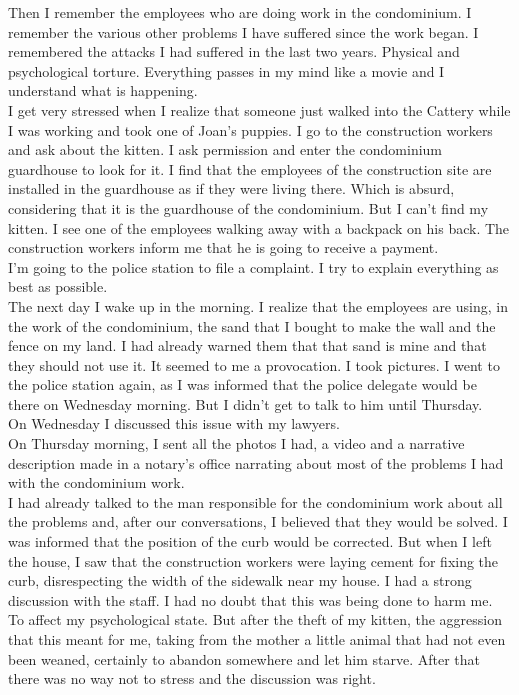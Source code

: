 \documentclass[11pt]{book}
\begin{document}
\noindent Then I remember the employees who are doing work in the condominium. I remember the various other problems I have suffered since the work began. I remembered the attacks I had suffered in the last two years. Physical and psychological torture. Everything passes in my mind like a movie and I understand what is happening. \\

\noindent I get very stressed when I realize that someone just walked into the Cattery while I was working and took one of Joan's puppies. I go to the construction workers and ask about the kitten. I ask permission and enter the condominium guardhouse to look for it. I find that the employees of the construction site are installed in the guardhouse as if they were living there. Which is absurd, considering that it is the guardhouse of the condominium. But I can't find my kitten. I see one of the employees walking away with a backpack on his back. The construction workers inform me that he is going to receive a payment. \\

\noindent I'm going to the police station to file a complaint. I try to explain everything as best as possible. \\

\noindent The next day I wake up in the morning. I realize that the employees are using, in the work of the condominium, the sand that I bought to make the wall and the fence on my land. I had already warned them that that sand is mine and that they should not use it. It seemed to me a provocation. I took pictures. I went to the police station again, as I was informed that the police delegate would be there on Wednesday morning. But I didn't get to talk to him until Thursday. \\

\noindent On Wednesday I discussed this issue with my lawyers. \\

\noindent On Thursday morning, I sent all the photos I had, a video and a narrative description made in a notary's office narrating about most of the problems I had with the condominium work. \\

\noindent I had already talked to the man responsible for the condominium work about all the problems and, after our conversations, I believed that they would be solved. I was informed that the position of the curb would be corrected. But when I left the house, I saw that the construction workers were laying cement for fixing the curb, disrespecting the width of the sidewalk near my house. I had a strong discussion with the staff. I had no doubt that this was being done to harm me. To affect my psychological state. But after the theft of my kitten, the aggression that this meant for me, taking from the mother a little animal that had not even been weaned, certainly to abandon somewhere and let him starve. After that there was no way not to stress and the discussion was right. \\
\end{document}
